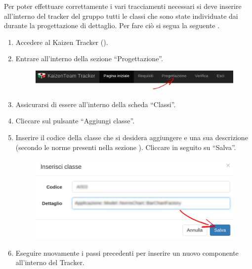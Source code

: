 					 \label{sec:InsClasse}
					Per poter effettuare correttamente i vari tracciamenti necessari si deve inserire all'interno del tracker del gruppo tutti le classi che sono state individuate dai  durante la progettazione di dettaglio. Per fare ciò si segua la seguente .
					\begin{enumerate}
						\item Accedere al Kaizen  Tracker ().
						\item Entrare all'interno della sezione “Progettazione”.
						\begin{figure}[H]
							\centering
							\includegraphics[width=\textwidth]{Pics/HomePageMenuFrecciaProg}
						\end{figure}
						\item Assicurarsi di essere all'interno della scheda “Classi”.
						\item Cliccare sul pulsante “Aggiungi classe”.
						\item Inserire il codice della classe che si desidera aggiungere e una sua descrizione (secondo le norme presenti nella sezione ). Cliccare in seguito su “Salva”.
						\begin{figure}[H]
							\centering
							\includegraphics[width=\textwidth]{Pics/InserireClasse}
						\end{figure}
						\item Eseguire nuovamente i passi precedenti per inserire un nuovo componente all'interno del Tracker.
					\end{enumerate}

